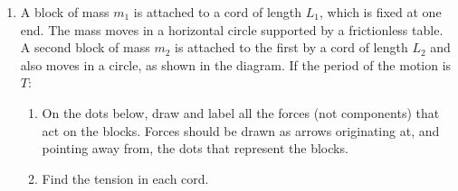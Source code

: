 \begin{enumerate}[itemsep=6pt]
  \begin{center}
  \end{center}
  
\item A block of mass $m_1$ is attached to a cord of length $L_1$, which
  is fixed at one end. The mass moves in a horizontal circle supported by a
  frictionless table. A second block of mass $m_2$ is attached to the first by
  a cord of length $L_2$ and also moves in a circle, as shown in the diagram.
  If the period of the motion is $T$:
  \begin{enumerate}[itemsep=3pt]
  \item On the dots below, draw and label all the forces (not components) that
    act on the blocks. Forces should be drawn as arrows originating at, and
    pointing away from, the dots that represent the blocks.
  \item Find the tension in each cord.
  \end{enumerate}
\end{enumerate}

